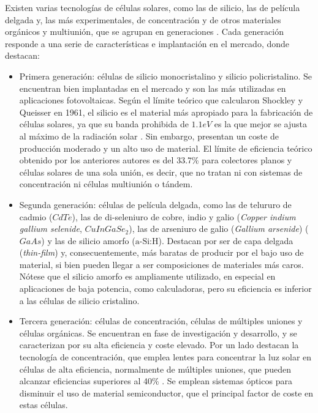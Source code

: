 Existen varias tecnologías de células solares, como las de silicio, las de película delgada y, las más experimentales, de concentración y de otros materiales orgánicos y multiunión, que se agrupan en generaciones \cite{Shubbak_2019}. Cada generación responde a una serie de características e implantación en el mercado, donde destacan:

\begin{itemize}
      \item Primera generación: células de \gls{silicio monocristalino} y \gls{silicio policristalino}.
            Se encuentran bien implantadas en el mercado y son las más utilizadas en aplicaciones fotovoltaicas. Según el límite teórico que calcularon Shockley y Queisser en 1961, el silicio es el material más apropiado para la fabricación de células solares, ya que su \gls{banda prohibida} de $1.1 eV$ es la que mejor se ajusta al máximo de la \gls{radiación solar} \cite[][p. 1126]{böer2002survey}. Sin embargo, presentan un coste de producción moderado y un alto uso de material. El límite de eficiencia teórico obtenido por los anteriores autores es del 33.7\% \cite{Shockley_Queisser_1961} para \gls{colectores} planos y células solares de una sola unión, es decir, que no tratan ni con \gls{sistemas de concentración} ni \gls{células multiunión o tándem}.
      \item Segunda generación: células de película delgada, como las de telururo de cadmio ($CdTe$), las de di-seleniuro de cobre, indio y galio (\textit{Copper indium gallium selenide}, $CuInGaSe_2$), las de arseniuro de galio (\textit{Gallium arsenide}) ($GaAs$) y las de \gls{silicio amorfo} ($\text{a-Si:H}$).
            Destacan por ser de capa delgada (\textit{thin-film}) y, consecuentemente, más baratas de producir por el bajo uso de material, si bien pueden llegar a ser composiciones de materiales más caros.
            Nótese que el \gls{silicio amorfo} es ampliamente utilizado, en especial en aplicaciones de baja potencia, como calculadoras, pero su eficiencia es inferior a las células de silicio cristalino.
      \item Tercera generación: células de concentración, células de múltiples uniones y \gls{células orgánicas}.
            Se encuentran en fase de investigación y desarrollo, y se caracterizan por su alta eficiencia y coste elevado.
            Por un lado destacan la tecnología de concentración, que emplea lentes para concentrar la luz solar en células de alta eficiencia, normalmente de múltiples uniones, que pueden alcanzar eficiencias superiores al 40\% \cite[][Tabla 5]{Green_Dunlop_Yoshita_Kopidakis_Bothe_Siefer_Hao_2024}. Se emplean sistemas ópticos para disminuir el uso de material \gls{semiconductor}, que el principal factor de coste en estas células.
\end{itemize}

